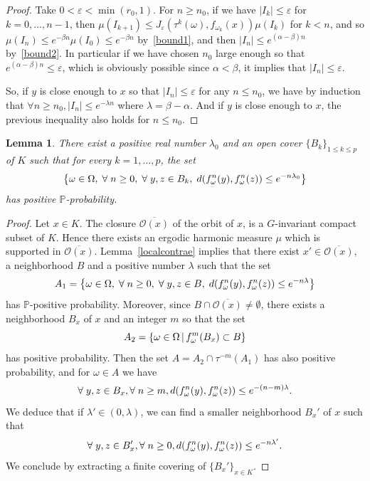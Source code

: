 \documentclass[10pt]{amsart}
\newtheorem{lemm}[theo]{Lemma}\newtheorem{prop}[theo]{Proposition}\newtheorem{coro}[theo]{Corollary}\newtheorem{conj}[theo]{Conjecture}
\theoremstyle{definition}\newtheorem{defi}[theo]{Definition}\newtheorem{rema}[theo]{Remark}\newtheorem{exam}[theo]{Example}\newtheorem{exem}[theo]{Example}\newtheorem{nota}[theo]{Notation}
\newcommand{\bbP}{\mathbb{P}}
\newcommand{\clO}{\mathcal{O}}
\newcommand{\ep}{\varepsilon}
\let\originalleft\left
\let\originalright\right
\renewcommand{\left}{\mathopen{}\mathclose\bgroup\originalleft}
\renewcommand{\right}{\aftergroup\egroup\originalright}
\let\oldforall\forall
\renewcommand*{\forall}{\mathrel{\oldforall}}
\begin{document}
\begin{proof}
Take $0 <\ep < \min(r_0,1)$. For $n\geq n_0$, if we have $|I_k|\leq \ep$ for $k=0,\dots, n-1$, then $\mu(I_{k+1})\leq J_\ep(\tau^k(\omega),f_{\omega_k}(x))\mu(I_k)$ for $k<n$, and so $\mu(I_n)\leq e^{-\beta n}\mu(I_0)\leq e^{-\beta n}$ by~\eqref{bound1}, and then $|I_n|\leq e^{(\alpha-\beta)n}$ by~\eqref{bound2}. In particular if we have chosen $n_0$ large enough so that $e^{(\alpha-\beta)n}\leq \ep$, which is obviously possible since $\alpha<\beta$, it implies that $|I_n|\leq \ep$.

So, if $y$ is close enough to $x$ so that $|I_{n}|\leq \ep$ for any $n \leq n_0$, we have by induction that $\forall n\geq n_0, |I_n|\leq e^{-\lambda n}$ where $\lambda=\beta-\alpha$. And if $y$ is close enough to $x$, the previous inequality also holds for $n\leq n_0$.
\end{proof}

\begin{lemm}\label{uniform}
There exist a positive real number $\lambda_0$ and an open cover $\{B_k\}_{1\leq k\leq p}$ of $K$ such that for every $k=1,\dots,p$, the set
\[
\left\{\omega\in \Omega,\;\forall n\geq 0,\;\forall y,z \in B_k,\; d\left(f_\omega^n(y),f_\omega^n(z)\right)\leq e^{-n\lambda_0}\right\}
\]
has positive $\bbP$-probability.
\end{lemm}
\begin{proof}
Let $x\in K$. The closure $\overline{\clO(x)}$ of the orbit of $x$, is a $G$-invariant compact subset of $K$. Hence there exists an ergodic harmonic measure $\mu$ which is supported in $\overline{\clO(x)}$. Lemma~\ref{localcontrae} implies that there exist $x'\in \overline{\clO(x)}$, a neighborhood $B$ and a positive number $\lambda$ such that the set
\[
A_1=\left\{\omega\in \Omega,\;\forall n\geq 0,\; \forall y,z \in B,\; d\left(f_\omega^n(y),f_\omega^n(z)\right)\leq e^{-n\lambda}\right\}
\]
has $\bbP$-positive probability. Moreover, since $B\cap \overline{\clO(x)}\not=\emptyset$, there exists a neighborhood $B_x$ of $x$ and an integer $m$ so that the set
\[
A_2=\left\{\omega\in\Omega\,\middle|\,f_\omega^m(B_x)\subset B\right\}
\]
has positive probability. Then the set $A=A_2 \cap \tau^{-m}(A_1)$ has also positive probability, and for $\omega\in A$ we have
\[
\forall y,z \in B_x, \forall n\geq m, d\left(f_\omega^n(y),f_\omega^n(z)\right)\leq e^{-(n-m)\lambda}.
\]
We deduce that if $\lambda'\in (0,\lambda)$, we can find a smaller neighborhood $B_x'$ of $x$ such that
\[
\forall y,z \in B_x', \forall n\geq 0, d\left(f_\omega^n(y),f_\omega^n(z)\right)\leq e^{-n\lambda'}.
\]
We conclude by extracting a finite covering of $\{B_x'\}_{x\in K}$.
\end{proof}
\end{document}
